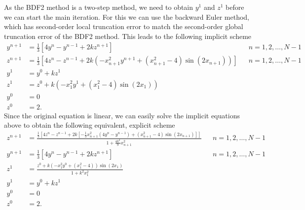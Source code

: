 \documentclass{homework}
\begin{document}
	\begin{alphaparts}
		\questionpart As the BDF2 method is a two-step method, we need to obtain $y^1$ and $z^1$ before we can start the main iteration. For this we can use the backward Euler method, which has second-order local truncation error to match the second-order global truncation error of the BDF2 method. This leads to the following implicit scheme
		\begin{align*}
			y^{n+1} &= \frac{1}{3}\left[4y^n - y^{n-1} + 2kz^{n+1}\right] && n =1,2,\dots, N-1\\
			z^{n+1} &= \frac{1}{3}\left[4z^n - z^{n-1} +2k(-x_{n+1}^2y^{n+1} + (x_{n+1}^2 - 4)\sin(2x_{n+1}))\right]&& n=1,2,\dots,N-1 \\
			y^1 &= y^0 + kz^1 \\
			z^1 &= z^0 + k(-x_1^2y^1 + (x_1^2 -4)\sin(2x_1)) \\
			y^0 &= 0 \\
			z^0 &= 2.
		\end{align*}
		Since the original equation is linear, we can easily solve the implicit equations above to obtain the following equivalent, explicit scheme
		\begin{align*}
			z^{n+1} &= \frac{\frac{1}{3}\left[4z^n - z^{n-1} + 2k\left[-\frac{1}{3}x_{n+1}^2(4y^n - y^{n-1}) + (x_{n+1}^2 - 4)\sin(2x_{n+1})\right]\right]}{1 + \frac{4k^2}{9}x_{n+1}^2} && n = 1,2,\dots,N-1\\
			y^{n+1} &= \frac{1}{3}\left[4y^n - y^{n-1} + 2kz^{n+1}\right] && n =1,2,\dots, N-1\\
			z^1 &= \frac{z^0 + k(-x_1^2y^0 + (x_1^2-4))\sin(2x_1)}{1 + k^2x_1^2} \\
			y^1 &= y^0 + kz^1 \\
			y^0 &= 0 \\
			z^0 &= 2.
		\end{align*}
		\questionpart
		

\end{alphaparts}
\end{document}
